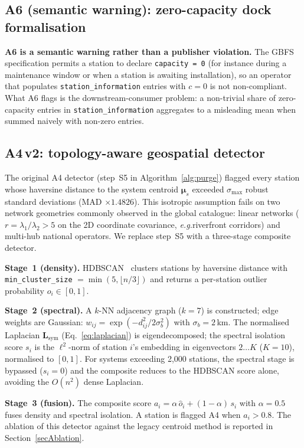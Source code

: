 \documentclass[11pt,a4paper]{article}
\newcommand{\eg}{\emph{e.g.}}
\begin{document}
\subsection{A6 (semantic warning): zero-capacity dock formalisation}\label{secA6Formalisation}
\textbf{A6 is a semantic warning rather than a publisher violation.}
The GBFS specification permits a station to declare
\texttt{capacity = 0} (for instance during a maintenance window
or when a station is awaiting installation), so an operator that
populates \texttt{station\_information} entries with $c = 0$ is
not non-compliant. What A6 flags is the downstream-consumer
problem: a non-trivial share of zero-capacity entries in
\texttt{station\_information} aggregates to a misleading mean
when summed naively with non-zero entries.

\subsection{A4\,v2: topology-aware geospatial detector}\label{secA4v2}
The original A4 detector (step~S5 in Algorithm~\ref{alg:purge})
flagged every station whose haversine distance to the system centroid
$\boldsymbol{\mu}_s$ exceeded $\sigma_{\max}$ robust standard
deviations (MAD $\times 1.4826$). This isotropic assumption fails on
two network geometries commonly observed in the global catalogue:
linear networks ($r = \lambda_1/\lambda_2 > 5$ on the 2D coordinate
covariance, \eg riverfront corridors) and multi-hub national
operators. We replace step~S5 with a three-stage composite detector.

\textbf{Stage~1 (density).} HDBSCAN~\cite{Campello2013HDBSCAN}
clusters stations by haversine distance with \texttt{min\_cluster\_size}
$= \min(5, \lfloor n/3 \rfloor)$ and returns a per-station outlier
probability $o_i \in [0,1]$.

\textbf{Stage~2 (spectral).} A $k$-NN adjacency graph ($k=7$) is
constructed; edge weights are Gaussian:
$w_{ij} = \exp(-d_{ij}^2 / 2\sigma_b^2)$ with $\sigma_b = 2$\,km.
The normalised Laplacian $\mathbf{L}_{\text{sym}}$
(Eq.~\ref{eq:laplacian}) is eigendecomposed; the spectral isolation
score $s_i$ is the $\ell^2$-norm of station $i$'s embedding in
eigenvectors $2 \ldots K$ ($K = 10$), normalised to $[0,1]$. For
systems exceeding 2{,}000 stations, the spectral stage is bypassed
($s_i = 0$) and the composite reduces to the HDBSCAN score alone,
avoiding the $O(n^2)$ dense Laplacian.

\textbf{Stage~3 (fusion).} The composite score
$a_i = \alpha\,\hat o_i + (1 - \alpha)\,s_i$ with $\alpha = 0.5$
fuses density and spectral isolation. A station is flagged A4 when
$a_i > 0.8$. The ablation of this detector against the legacy
centroid method is reported in Section~\ref{secAblation}.
\end{document}
